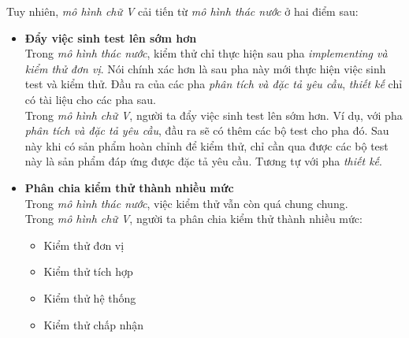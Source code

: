 \documentclass[14pt]{extarticle}
\begin{document}
Tuy nhiên, \textit{mô hình chữ V} cải tiến
từ \textit{mô hình thác nước} ở hai điểm sau:
\begin{itemize}
  \item \textbf{Đẩy việc sinh test lên sớm hơn}\\
        Trong \textit{mô hình thác nước}, kiểm thử chỉ thực hiện sau pha \textit{implementing
          và kiểm thử đơn vị}. Nói chính xác hơn là sau pha này mới thực hiện
        việc sinh test và kiểm thử. Đầu ra của các pha \textit{phân tích và đặc tả
          yêu cầu}, \textit{thiết kế} chỉ có tài liệu cho các pha sau. \\
        Trong \textit{mô hình chữ V}, người ta đẩy việc sinh test lên sớm hơn. Ví dụ,
        với pha \textit{phân tích và đặc tả yêu cầu}, đầu ra sẽ có thêm các bộ test
        cho pha đó. Sau này khi có sản phẩm hoàn chỉnh để kiểm thử, chỉ
        cần qua được các bộ test này là sản phẩm đáp ứng được đặc tả yêu cầu.
        Tương tự với pha \textit{thiết kế}.

  \item \textbf{Phân chia kiểm thử thành nhiều mức}\\
        Trong \textit{mô hình thác nước}, việc kiểm thử vẫn còn quá chung chung.\\
        Trong \textit{mô hình chữ V}, người ta phân chia kiểm thử thành nhiều mức:
        \begin{itemize}
          \item Kiểm thử đơn vị
          \item Kiểm thử tích hợp
          \item Kiểm thử hệ thống
          \item Kiểm thử chấp nhận
        \end{itemize}

\end{itemize}
\end{document}
